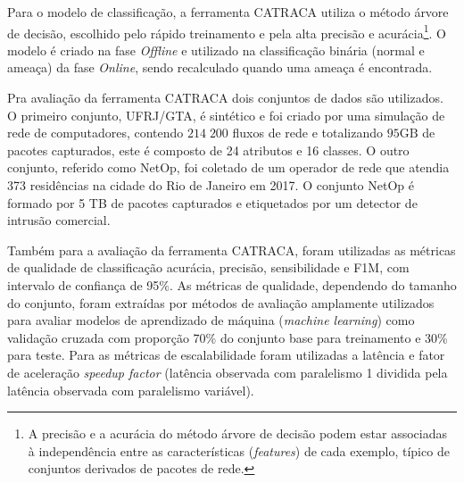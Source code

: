 
Para o modelo de classificação, a ferramenta CATRACA utiliza o método árvore de
decisão, escolhido pelo rápido treinamento e pela alta precisão e acurácia\footnote{
    A precisão e a acurácia do método árvore de decisão podem estar associadas
    à independência entre as características (\emph{features}) de cada exemplo,
    típico de conjuntos derivados de pacotes de rede.
}.
O modelo é criado na fase \emph{Offline} e utilizado na classificação binária
(normal e ameaça) da fase \emph{Online}, sendo recalculado quando uma ameaça
é encontrada.


Pra avaliação da ferramenta CATRACA dois conjuntos de dados são utilizados.
O primeiro conjunto, UFRJ/GTA, é sintético e foi criado por uma simulação de
rede de computadores, contendo $214\;200$ fluxos de rede e totalizando $95
\mathrm{GB}$ de pacotes capturados, este \dataset
é composto de 24 atributos e 16 classes.
O outro conjunto, referido como NetOp, foi coletado de um operador de rede que
atendia 373 residências na cidade do Rio de Janeiro em 2017.
O conjunto NetOp é formado por 5 TB de pacotes capturados e etiquetados por um
detector de intrusão comercial.

Também para a avaliação da ferramenta CATRACA, foram utilizadas as métricas de qualidade
de classificação acurácia, precisão, sensibilidade e F1M, com intervalo de
confiança de 95\%.
As métricas de qualidade, dependendo do tamanho do conjunto, foram extraídas por
métodos de avaliação amplamente utilizados para avaliar modelos de aprendizado
de máquina (\emph{machine learning}) como validação cruzada com proporção
70\% do conjunto base para treinamento e 30\% para teste.
Para as métricas de escalabilidade foram utilizadas a latência e fator de aceleração
\emph{speedup factor} (latência observada com paralelismo 1 dividida pela
latência observada com paralelismo variável).

